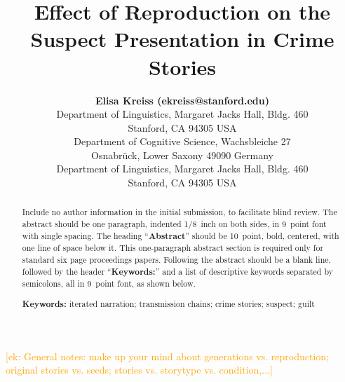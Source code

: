 \documentclass[10pt,letterpaper]{article}
\title{Effect of Reproduction on the Suspect Presentation in Crime Stories}
\author{{\large \bf Elisa Kreiss (ekreiss@stanford.edu)} \\
  Department of Linguistics, Margaret Jacks Hall, Bldg. 460 \\
  Stanford, CA 94305 USA
  \AND {\large \bf Michael Franke (...)} \\
  Department of Cognitive Science, Wachsbleiche 27 \\
  Osnabrück, Lower Saxony 49090 Germany
  \AND {\large \bf Judith Degen (jdegen@stanford.edu)} \\
  Department of Linguistics, Margaret Jacks Hall, Bldg. 460 \\
  Stanford, CA 94305 USA}
\newcommand{\ek}[1]{\textcolor{Orange}{[ek: #1]}}
\begin{document}
\maketitle


\begin{abstract}
Include no author information in the initial submission, to facilitate
blind review.  The abstract should be one paragraph, indented 1/8~inch on both sides,
in 9~point font with single spacing. The heading ``{\bf Abstract}''
should be 10~point, bold, centered, with one line of space below
it. This one-paragraph abstract section is required only for standard
six page proceedings papers. Following the abstract should be a blank
line, followed by the header ``{\bf Keywords:}'' and a list of
descriptive keywords separated by semicolons, all in 9~point font, as
shown below.

\textbf{Keywords:} 
iterated narration; transmission chains; crime stories; suspect; guilt
\end{abstract}

\ek{General notes: make up your mind about generations vs. reproduction; original stories vs. seeds; stories vs. storytype vs. condition,...}\\
\end{document}
